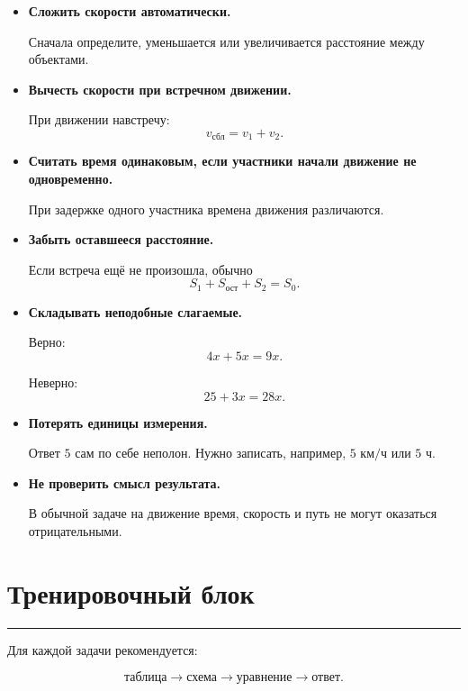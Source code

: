 \documentclass[a4paper,12pt]{article}
\newcommand{\kmh}{\text{ км/ч}}
\newcommand{\hour}{\text{ ч}}
\newcommand{\sectionline}{
    \vspace{-0.2em}
    {\color{linegray}\rule{\linewidth}{0.5pt}}
    \vspace{0.5em}
}
\begin{document}
\begin{itemize}
    \item \textbf{Сложить скорости автоматически.}

    Сначала определите, уменьшается или увеличивается расстояние между
    объектами.

    \item \textbf{Вычесть скорости при встречном движении.}

    При движении навстречу:
    \[
    v_{\text{сбл}}=v_1+v_2.
    \]

    \item \textbf{Считать время одинаковым, если участники начали
    движение не одновременно.}

    При задержке одного участника времена движения различаются.

    \item \textbf{Забыть оставшееся расстояние.}

    Если встреча ещё не произошла, обычно
    \[
    S_1+S_{\text{ост}}+S_2=S_0.
    \]

    \item \textbf{Складывать неподобные слагаемые.}

    Верно:
    \[
    4x+5x=9x.
    \]

    Неверно:
    \[
    25+3x=28x.
    \]

    \item \textbf{Потерять единицы измерения.}

    Ответ \(5\) сам по себе неполон. Нужно записать, например,
    \(5\kmh\) или \(5\hour\).

    \item \textbf{Не проверить смысл результата.}

    В обычной задаче на движение время, скорость и путь не могут
    оказаться отрицательными.
\end{itemize}


\clearpage

\section*{\textcolor{darkaccent}{Тренировочный блок}}

\sectionline

Для каждой задачи рекомендуется:

\[
\boxed{\text{таблица}}
\longrightarrow
\boxed{\text{схема}}
\longrightarrow
\boxed{\text{уравнение}}
\longrightarrow
\boxed{\text{ответ}}.
\]
\end{document}
